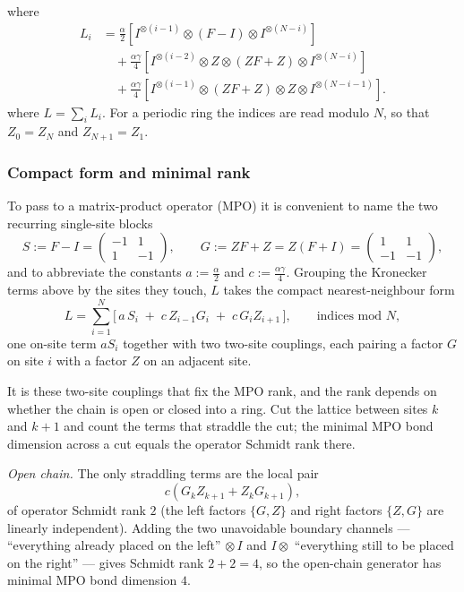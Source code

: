 \documentclass[12pt]{article}
\theoremstyle{definition}
\theoremstyle{remark}
\begin{document}
where 
\begin{align*}
L_i
&=
\frac{\alpha}{2}
\left[
I^{\otimes(i-1)}
\otimes (F-I)
\otimes I^{\otimes(N-i)}
\right] \\[4pt]
&\quad
+
\frac{\alpha\gamma}{4}
\left[
I^{\otimes(i-2)}
\otimes Z
\otimes (ZF+Z)
\otimes I^{\otimes(N-i)}
\right] \\[4pt]
&\quad
+
\frac{\alpha\gamma}{4}
\left[
I^{\otimes(i-1)}
\otimes (ZF+Z)
\otimes Z
\otimes I^{\otimes(N-i-1)}
\right].
\end{align*}
where $L = \sum_i L_i$. For a periodic ring the indices are read modulo \(N\), so that $Z_0 = Z_N$ and $Z_{N+1} = Z_1$.

\subsubsection{Compact form and minimal rank}

To pass to a matrix-product operator (MPO) it is convenient to name the two recurring single-site blocks
\[
S := F - I =
\begin{pmatrix} -1 & 1 \\ 1 & -1 \end{pmatrix},
\qquad
G := ZF + Z = Z(F+I) =
\begin{pmatrix} 1 & 1 \\ -1 & -1 \end{pmatrix},
\]
and to abbreviate the constants $a := \tfrac{\alpha}{2}$ and $c := \tfrac{\alpha\gamma}{4}$. Grouping the Kronecker terms above by the sites they touch, $L$ takes the compact nearest-neighbour form
\[
L = \sum_{i=1}^N \Big[\, a\, S_i \;+\; c\, Z_{i-1} G_i \;+\; c\, G_i Z_{i+1} \,\Big],
\qquad \text{indices mod } N,
\]
one on-site term $a S_i$ together with two two-site couplings, each pairing a factor $G$ on site $i$ with a factor $Z$ on an adjacent site.

It is these two-site couplings that fix the MPO rank, and the rank depends on whether the chain is open or closed into a ring. Cut the lattice between sites $k$ and $k+1$ and count the terms that straddle the cut; the minimal MPO bond dimension across a cut equals the operator Schmidt rank there.

\emph{Open chain.} The only straddling terms are the local pair
\[
c\left( G_k Z_{k+1} + Z_k G_{k+1} \right),
\]
of operator Schmidt rank $2$ (the left factors $\{G, Z\}$ and right factors $\{Z, G\}$ are linearly independent). Adding the two unavoidable boundary channels --- ``everything already placed on the left'' $\otimes\, I$ and $I \otimes$ ``everything still to be placed on the right'' --- gives Schmidt rank $2 + 2 = 4$, so the open-chain generator has minimal MPO bond dimension $4$.
\end{document}
